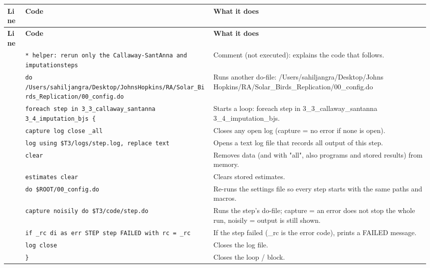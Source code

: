 \documentclass[10pt]{article}
\newcommand{\codetable}[1]{%
{\footnotesize
\begin{longtable}{>{\raggedleft\arraybackslash}p{0.55cm}>{\raggedright\arraybackslash}p{8.3cm}>{\raggedright\arraybackslash}p{8.0cm}}
\toprule \textbf{Line} & \textbf{Code} & \textbf{What it does}\\ \midrule \endfirsthead
\toprule \textbf{Line} & \textbf{Code} & \textbf{What it does}\\ \midrule \endhead
\bottomrule \endfoot
#1
\end{longtable}}}
\begin{document}
\codetable{1 & \texttt{* helper: rerun only the Callaway-{}Sant\textquotesingle{}Anna and imputation\newline \hspace*{1em}steps} & Comment (not executed): explains the code that follows.\\
2 & \texttt{do \textquotedbl{}/Users/sahiljangra/Desktop/Johns\newline \hspace*{1em}Hopkins/RA/Solar\_Birds\_Replication/00\_config.do\textquotedbl{}} & Runs another do-file: /Users/sahiljangra/Desktop/Johns Hopkins/RA/Solar\_Birds\_Replication/00\_config.do\\
3 & \texttt{foreach step in 3\_3\_callaway\_santanna 3\_4\_imputation\_bjs \{} & Starts a loop: foreach step in 3\_3\_callaway\_santanna 3\_4\_imputation\_bjs.\\
4 & \texttt{\hspace*{2.0em}capture log close \_all} & Closes any open log (capture = no error if none is open).\\
5 & \texttt{\hspace*{2.0em}log using \textquotedbl{}\$T3/logs/\textasciigrave{}step\textquotesingle{}.log\textquotedbl{}, replace text} & Opens a text log file that records all output of this step.\\
6 & \texttt{\hspace*{2.0em}clear} & Removes data (and with "all", also programs and stored results) from memory.\\
7 & \texttt{\hspace*{2.0em}estimates clear} & Clears stored estimates.\\
8 & \texttt{\hspace*{2.0em}do \textquotedbl{}\$ROOT/00\_config.do\textquotedbl{}} & Re-runs the settings file so every step starts with the same paths and macros.\\
9 & \texttt{\hspace*{2.0em}capture noisily do \textquotedbl{}\$T3/code/\textasciigrave{}step\textquotesingle{}.do\textquotedbl{}} & Runs the step's do-file; capture = an error does not stop the whole run, noisily = output is still shown.\\
10 & \texttt{\hspace*{2.0em}if \_rc di as err \textquotedbl{}STEP \textasciigrave{}step\textquotesingle{} FAILED with rc = \textquotedbl{} \_rc} & If the step failed (\_rc is the error code), prints a FAILED message.\\
11 & \texttt{\hspace*{2.0em}log close} & Closes the log file.\\
12 & \texttt{\}} & Closes the loop / block.\\}
\end{document}

